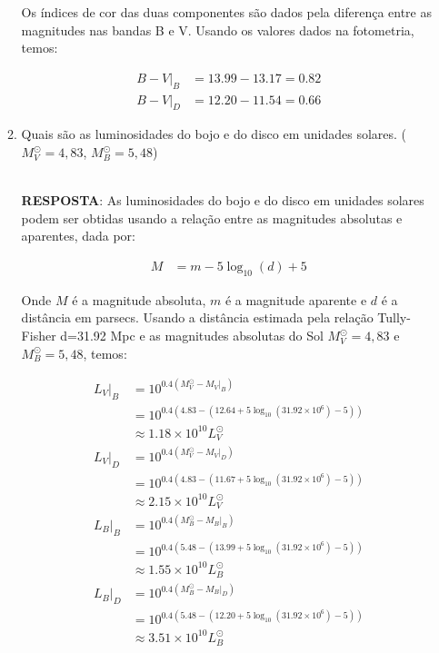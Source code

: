 \documentclass[a4paper,12pt]{article}
\begin{document}
\begin{enumerate}
\begin{enumerate}
Os índices de cor das duas componentes são dados pela diferença entre as magnitudes nas bandas B e V. Usando os valores dados na fotometria, temos:

\begin{align*}
B-V|_B &= 13.99 - 13.17 = 0.82\\
B-V|_D &= 12.20 - 11.54 = 0.66
\end{align*}

\noindent\hrulefill

\item Quais são as luminosidades do bojo e do disco em unidades solares. ($M_V^\odot =4,83$, $M_B^\odot =5,48$)

\noindent\hrulefill\\\textbf{RESPOSTA}: As luminosidades do bojo e do disco em unidades solares podem ser obtidas usando a relação entre as magnitudes absolutas e aparentes, dada por:

\begin{align*}
M &= m - 5 \log_{10} (d) + 5
\end{align*}

Onde $M$ é a magnitude absoluta, $m$ é a magnitude aparente e $d$ é a distância em parsecs. Usando a distância estimada pela relação Tully-Fisher d=31.92 Mpc e as magnitudes absolutas do Sol $M_V^\odot =4,83$ e $M_B^\odot =5,48$, temos:

\begin{align*}
L_V|_B &= 10^{0.4 (M_V^\odot - M_V|_B)}\\
&= 10^{0.4 (4.83 - (12.64 + 5 \log_{10} (31.92 \times 10^6) - 5))}\\
&\approx 1.18 \times 10^{10} L_V^\odot\\
L_V|_D &= 10^{0.4 (M_V^\odot - M_V|_D)}\\
&= 10^{0.4 (4.83 - (11.67 + 5 \log_{10} (31.92 \times 10^6) - 5))}\\
&\approx 2.15 \times 10^{10} L_V^\odot\\
L_B|_B &= 10^{0.4 (M_B^\odot - M_B|_B)}\\
&= 10^{0.4 (5.48 - (13.99 + 5 \log_{10} (31.92 \times 10^6) - 5))}\\
&\approx 1.55 \times 10^{10} L_B^\odot\\
L_B|_D &= 10^{0.4 (M_B^\odot - M_B|_D)}\\
&= 10^{0.4 (5.48 - (12.20 + 5 \log_{10} (31.92 \times 10^6) - 5))}\\
&\approx 3.51 \times 10^{10} L_B^\odot
\end{align*}


\end{enumerate}
\end{enumerate}
\end{document}
